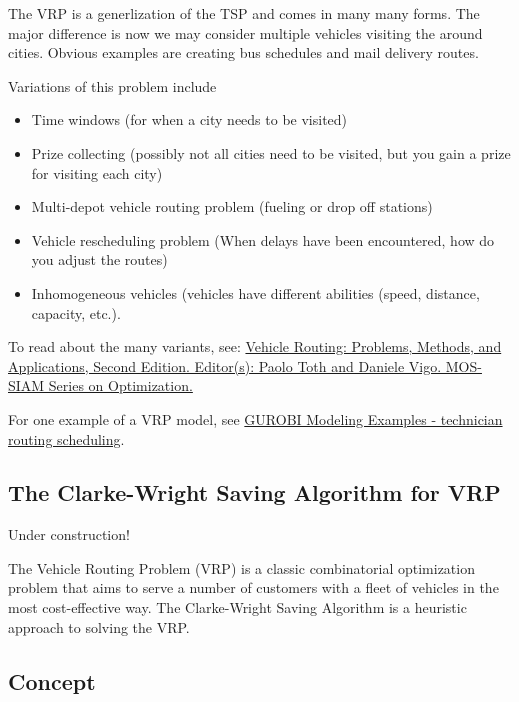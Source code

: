 The VRP is a generlization of the TSP and comes in many many forms.  The major difference is now we may consider multiple vehicles visiting the around cities.
Obvious examples are creating bus schedules and mail delivery routes.  

Variations of this problem include
\begin{itemize}
\item Time windows (for when a city needs to be visited)
\item Prize collecting (possibly not all cities need to be visited, but you gain a prize for visiting each city)
\item Multi-depot vehicle routing problem (fueling or drop off stations)
\item Vehicle rescheduling problem (When delays have been encountered, how do you adjust the routes)
\item Inhomogeneous vehicles (vehicles have different abilities (speed, distance, capacity, etc.).
\end{itemize}

To read about the many variants, see:
\href{https://doi-org.ezproxy.lib.vt.edu/10.1137/1.9781611973594}{
Vehicle Routing: Problems, Methods, and Applications, Second Edition. 
Editor(s): Paolo Toth and Daniele Vigo.  MOS-SIAM Series on Optimization.}


For one example of a VRP model, see \href{https://github.com/Gurobi/modeling-examples/tree/master/technician_routing_scheduling}{GUROBI Modeling Examples - technician routing scheduling}.






\subsection{The Clarke-Wright Saving Algorithm for VRP}
\begin{warn}
Under construction!
\end{warn}

The Vehicle Routing Problem (VRP) is a classic combinatorial optimization problem that aims to serve a number of customers with a fleet of vehicles in the most cost-effective way. The Clarke-Wright Saving Algorithm is a heuristic approach to solving the VRP. 

\subsection{Concept}


